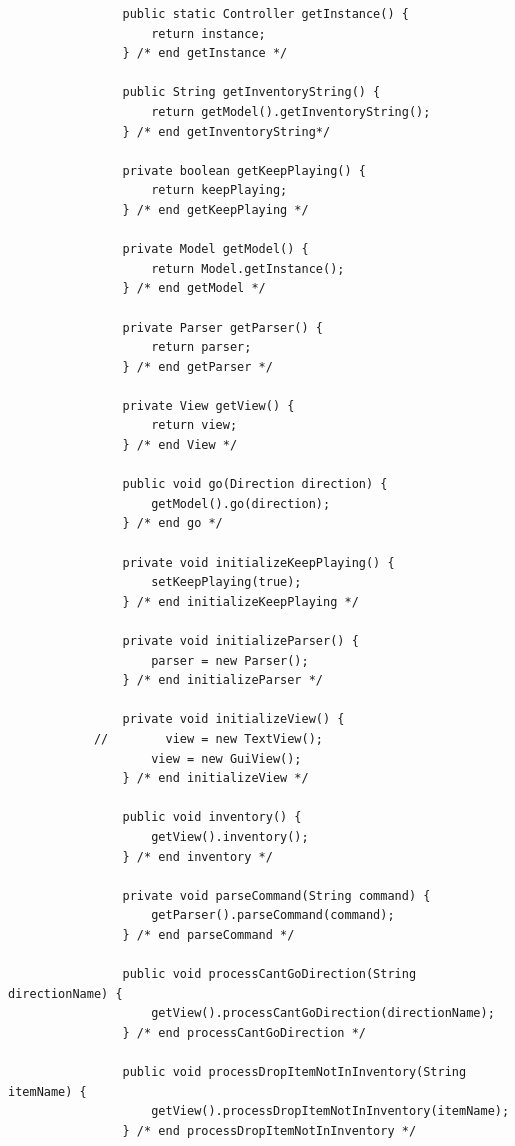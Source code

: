 \documentclass[a4paper, 11pt]{article}
\begin{document}
\begin{lstlisting}
                public static Controller getInstance() {
                    return instance;
                } /* end getInstance */

                public String getInventoryString() {
                    return getModel().getInventoryString();
                } /* end getInventoryString*/

                private boolean getKeepPlaying() {
                    return keepPlaying;
                } /* end getKeepPlaying */

                private Model getModel() {
                    return Model.getInstance();
                } /* end getModel */

                private Parser getParser() {
                    return parser;
                } /* end getParser */

                private View getView() {
                    return view;
                } /* end View */

                public void go(Direction direction) {
                    getModel().go(direction);
                } /* end go */

                private void initializeKeepPlaying() {
                    setKeepPlaying(true);
                } /* end initializeKeepPlaying */

                private void initializeParser() {
                    parser = new Parser();
                } /* end initializeParser */

                private void initializeView() {
            //        view = new TextView();
                    view = new GuiView();
                } /* end initializeView */

                public void inventory() {
                    getView().inventory();
                } /* end inventory */

                private void parseCommand(String command) {
                    getParser().parseCommand(command);
                } /* end parseCommand */

                public void processCantGoDirection(String directionName) {
                    getView().processCantGoDirection(directionName);
                } /* end processCantGoDirection */

                public void processDropItemNotInInventory(String itemName) {
                    getView().processDropItemNotInInventory(itemName);
                } /* end processDropItemNotInInventory */


\end{lstlisting}
\end{document}
